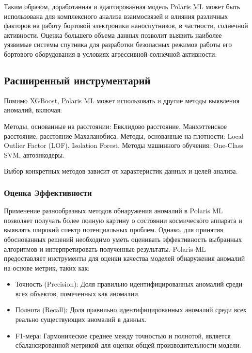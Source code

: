 \documentclass[14pt, a4paper]{extreport}
\begin{document}
    Таким образом, доработанная и адаптированная модель Polaris ML может быть использована для комплексного анализа взаимосвязей и влияния различных факторов на работу бортовой электроники наноспутников, в частности, солнечной активности.
    Оценка большего объема данных позволит выявить наиболее уязвимые системы спутника для разработки безопасных режимов работы его бортового оборудования в условиях агрессивной солнечной активности.

    \subsection{Расширенный инструментарий}

    Помимо XGBoost, Polaris ML может использовать и другие методы выявления аномалий, включая:

    Методы, основанные на расстоянии: Евклидово расстояние, Манхэттенское расстояние, расстояние Махаланобиса.
    Методы, основанные на плотности: Local Outlier Factor (LOF), Isolation Forest.
    Методы машинного обучения: One-Class SVM, автоэнкодеры.

    Выбор конкретных методов зависит от характеристик данных и целей анализа.

    \subsubsection{Оценка Эффективности}
    Применение разнообразных методов обнаружения аномалий в Polaris ML позволяет получать более полную картину о состоянии космического аппарата и выявлять широкий спектр потенциальных проблем. Однако, для принятия обоснованных решений необходимо уметь оценивать эффективность выбранных алгоритмов и интерпретировать полученные результаты.
    Polaris ML предоставляет инструменты для оценки качества моделей обнаружения аномалий на основе метрик, таких как:

    \begin{itemize}
        \item Точность (Precision): Доля правильно идентифицированных аномалий среди всех объектов, помеченных как аномалии.
        \item Полнота (Recall): Доля правильно идентифицированных аномалий среди всех реально существующих аномалий в данных.
        \item F1-мера: Гармоническое среднее между точностью и полнотой, является сбалансированной метрикой для оценки общей производительности модели.
    \end{itemize}
\end{document}
